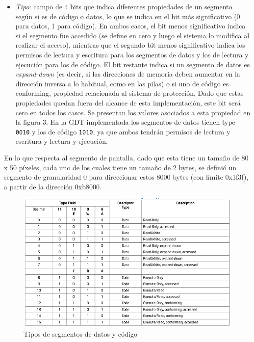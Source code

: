 \documentclass[a4paper]{article}
\begin{document}
\begin{itemize}
\item \textit{Tipo}: campo de 4 bits que indica diferentes propiedades de un segmento según si es de código o datos, lo que se indica en el bit más significativo (0 para datos, 1 para código). En ambos casos, el bit menos significativo indica si el segmento fue accedido (se define en cero y luego el sistema lo modifica al realizar el acceso), mientras que el segundo bit menos significativo indica los permisos de lectura y escritura para los segmentos de datos y los de lectura y ejecución para los de código. El bit restante indica si un segmento de datos es \textit{expand-down} (es decir, si las direcciones de memoria deben aumentar en la dirección inversa a lo habitual, como en las pilas) o si uno de código es conforming, propiedad relacionada al sistema de protección. Dado que estas propiedades quedan fuera del alcance de esta implementación, este bit será cero en todos los casos. Se presentan los valores asociados a esta propiedad en la figura 3. En la GDT implementada los segmentos de datos tienen type {\tt 0010} y los de código {\tt 1010}, ya que ambos tendrán permisos de lectura y escritura y lectura y ejecución. 
\end{itemize}

En lo que respecta al segmento de pantalla, dado que esta tiene un tamaño de 80 x 50 píxeles, cada uno de los cuales tiene un tamaño de 2 bytes, se definió un segmento de granularidad 0 para direccionar estos 8000 bytes (con límite 0x1f3f), a partir de la dirección 0xb8000.

\begin{figure}[!htb]
  \begin{center}
	\includegraphics[scale=0.6]{img/tiposSegmentosDatosCodigo.png}
	\caption{Tipos de segmentos de datos y código}
  \end{center}
\end{figure}
\end{document}
